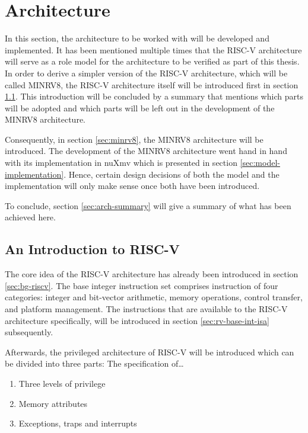 
\section{Architecture}
\label{sec:arch}

In this section, the architecture to be worked with will be developed and implemented.
It has been mentioned multiple times that the RISC-V architecture will serve as a role model for the architecture to be verified as part of this thesis.
In order to derive a simpler version of the RISC-V architecture, which will be called MINRV8, the RISC-V architecture itself will be introduced first in section \ref{sec:risc-v}.
This introduction will be concluded by a summary that mentions which parts will be adopted and which parts will be left out in the development of the MINRV8 architecture.

Consequently, in section \ref{sec:minrv8}, the MINRV8 architecture will be introduced.
The development of the MINRV8 architecture went hand in hand with its implementation in nuXmv which is presented in section \ref{sec:model-implementation}.
Hence, certain design decisions of both the model and the implementation will only make sense once both have been introduced.

To conclude, section \ref{sec:arch-summary} will give a summary of what has been achieved here.

\subsection{An Introduction to RISC-V}
\label{sec:risc-v}

The core idea of the RISC-V architecture has already been introduced in section \ref{sec:bg-riscv}.
The base integer instruction set comprises instruction of four categories: integer and bit-vector arithmetic, memory operations, control transfer, and platform management.
The instructions that are available to the RISC-V architecture specifically, will be introduced in section \ref{sec:rv-base-int-isa} subsequently.

Afterwards, the privileged architecture of RISC-V will be introduced which can be divided into three parts:
The specification of\dots
\begin{enumerate}
    \item Three levels of privilege
    \item Memory attributes
    \item Exceptions, traps and interrupts
\end{enumerate}

